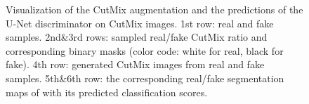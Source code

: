\documentclass[10pt,twocolumn,letterpaper]{article}
\begin{document}
\begin{figure}

	\vspace{-0.5em}

	\caption{\label{fig:cutmix} Visualization of the CutMix augmentation and the predictions of the U-Net discriminator on CutMix images. 1st row: real and fake samples. 2nd\&3rd rows: sampled real/fake CutMix ratio  and corresponding binary masks  (color code: white for real, black for fake). 4th row: generated CutMix images from real and fake samples. 5th\&6th row: the corresponding real/fake segmentation maps of  with its predicted classification scores. }
	\vspace{-0.5em}
\end{figure}
 
\end{document}
